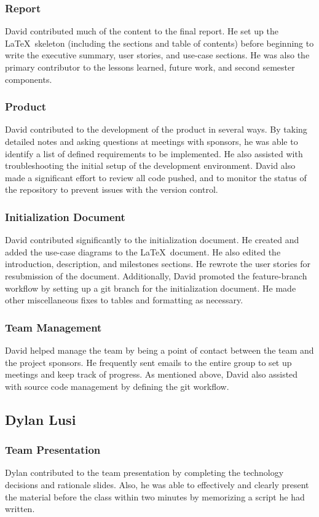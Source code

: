 \documentclass[12pt]{article}
\begin{document}
\begin{spacing}{1.5}
\subsubsection{Report}
David contributed much of the content to the final report. He set up the \LaTeX\ skeleton (including the sections and table of contents) before beginning to write the executive summary, user stories, and use-case sections. He was also the primary contributor to the lessons learned, future work, and second semester components.
\subsubsection{Product}
David contributed to the development of the product in several ways. By taking detailed notes and asking questions at meetings with sponsors, he was able to identify a list of defined requirements to be implemented. He also assisted with troubleshooting the initial setup of the development environment. David also made a significant effort to review all code pushed, and to monitor the status of the repository to prevent issues with the version control.
\subsubsection{Initialization Document}
David contributed significantly to the initialization document. He created and added the use-case diagrams to the \LaTeX\ document. He also edited the introduction, description, and milestones sections. He rewrote the user stories for resubmission of the document. Additionally, David promoted the feature-branch workflow by setting up a git branch for the initialization document. He made other miscellaneous fixes to tables and formatting as necessary.
\subsubsection{Team Management}
David helped manage the team by being a point of contact between the team and the project sponsors. He frequently sent emails to the entire group to set up meetings and keep track of progress. As mentioned above, David also assisted with source code management by defining the git workflow.

\clearpage

\subsection{Dylan Lusi}
\subsubsection{Team Presentation}
Dylan contributed to the team presentation by completing the technology decisions and rationale slides.  Also, he was able to effectively and clearly present the material before the class within two minutes by memorizing a script he had written.

\end{spacing}
\end{document}
